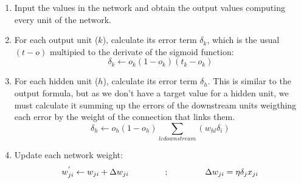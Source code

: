 		\begin{enumerate}

			\item Input the values in the network and obtain the output values computing every unit of the network.
			\item For each output unit ($k$), calculate its error term $\delta_k$, which is the usual $(t-o)$ multipied to the derivate of the sigmoid function:
				\begin{equation}
					\label{backpropagation_output_error}
					\delta_k \leftarrow o_k (1 - o_k)(t_k - o_k)
				\end{equation}				

			\item For each hidden unit ($h$), calculate its error term $\delta_h$. This is similar to the output formula, but as we don't have a target value for a hidden unit, we must calculate it summing up the errors of the downstream units weigthing each error by the weight of the connection that links them. 
				\begin{equation}
					\label{backpropagation_hidden_error}
					\delta_h \leftarrow o_h (1 - o_h) \sum_{l \varepsilon downstream} (w_{hl} \delta_i)
				\end{equation}

			\item Update each network weight:
				\begin{equation}
					\label{backpropagation_weight_update}
					w^{'}_{ji} \leftarrow w_{ji} + \Delta w_{ji} \hspace{1.5cm} ; \hspace{1.5cm} \Delta w_{ji} = \eta \delta_j x_{ji}
				\end{equation}

		\end{enumerate} 

%
%


